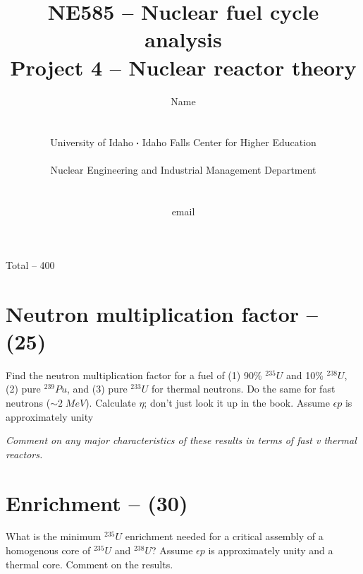 \documentclass[11pt,a4paper]{article}
\newcommand*\sq{\mathbin{\vcenter{\hbox{\rule{.3ex}{.3ex}}}}} %
\begin{document}
\begin{titlepage}
    \title{
        NE585 -- Nuclear fuel cycle analysis\\
        Project 4 -- Nuclear reactor theory\\
    }
    \author{
        Name
        \\ \\ \\
        University of Idaho $\sq$ Idaho Falls Center for Higher Education
        \\ \\
        Nuclear Engineering and Industrial Management Department
        \\ \\ \\
        email 
    }
\clearpage %
\maketitle
\vspace*{\fill}
\begin{flushright}{
        Total -- 400
}
\end{flushright}
\thispagestyle{empty} %
\end{titlepage}


\section{Neutron multiplication factor -- (25)}
Find the neutron multiplication factor for a fuel of (1) 90\% $^{235}U$ and 10\% $^{238}U$, (2) pure $^{239}Pu$, and (3) pure $^{233}U$ for thermal neutrons. Do the same for fast neutrons ($\sim 2 \; MeV$). Calculate $\eta$; don't just look it up in the book. Assume $\epsilon p$ is approximately unity 


\textit{Comment on any major characteristics of these results in terms of fast v thermal reactors.}





\newpage

\section{Enrichment -- (30)}
What is the minimum $^{235}U$ enrichment needed for a critical assembly of a homogenous core of $^{235}U$ and $^{238}U$? Assume $\epsilon p$ is approximately unity and a thermal core. Comment on the results. 
\end{document}
